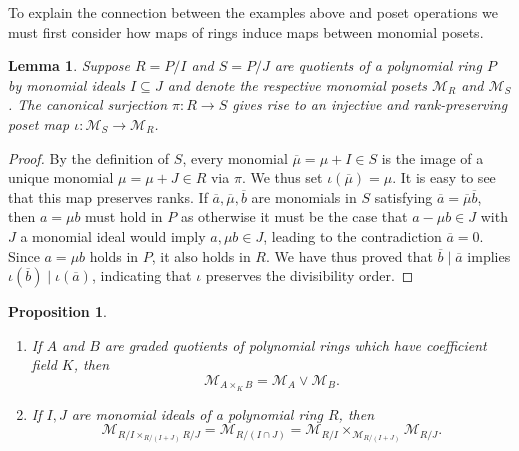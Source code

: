 \documentclass[11pt, reqno]{amsart}
\newcommand{\M}{{\mathcal M}}
\theoremstyle{plain} %
\newtheorem{lem}[thm]{Lemma}
\newtheorem{prop}[thm]{Proposition}
\theoremstyle{definition}
\theoremstyle{remark}
\numberwithin{equation}{section}  %
\begin{document}
To explain the connection between the examples above and  poset operations we must first consider how maps of rings induce maps between monomial posets.

\begin{lem}\label{lem: M functor}
Suppose  $R=P/I$ and $S=P/J$ are quotients of a polynomial ring $P$ by monomial ideals $I\subseteq J$ and denote the respective monomial posets $\M_R$ and $\M_S$. The canonical surjection $\pi:R\to S$ gives rise to an injective and rank-preserving poset map $\iota:\M_S\to \M_R$.
\end{lem}
\begin{proof}
    By the definition of $S$, every monomial $\overline{\mu}=\mu+I\in S$ is the image of a unique monomial $\mu=\mu+J\in R$ via $\pi$.  We thus set $\iota(\overline{\mu})=\mu$. It is easy to see that this map preserves ranks. If $\overline{a}, \overline{\mu}, \overline{b}$ are monomials in $S$ satisfying $\overline{a}=\overline{\mu} \overline{b}$, then $a=\mu b$ must hold  in $P$ as otherwise it must be the case that $a-\mu b\in J$ with $J$ a monomial ideal would imply $a, \mu b\in J$, leading to the contradiction $\overline{a}= 0$. Since $a=\mu b$  holds  in $P$, it also holds in $R$. We have thus proved that $\overline{b}\mid \overline{a}$ implies $\iota(\overline{b})\mid \iota(\overline{a})$, indicating that $\iota$ preserves the divisibility order.
\end{proof}



\begin{prop}\label{prop: FP}
\begin{enumerate}
\item If $A$ and $B$ are graded quotients of polynomial rings which have coefficient field $K$,  then
\[
\M_{A\times_K B}=\M_A \vee\M_B.
\]

\item If $I, J$ are  monomial ideals of a polynomial ring $R$,  then
\[
\M_{R/I\times_{R/(I+J)}R/J}=\M_{R/(I\cap J)}=\M_{R/I} \times _{\M_{R/(I+J)}} \M_{R/J}.
\]
\end{enumerate}
\end{prop}
\end{document}
